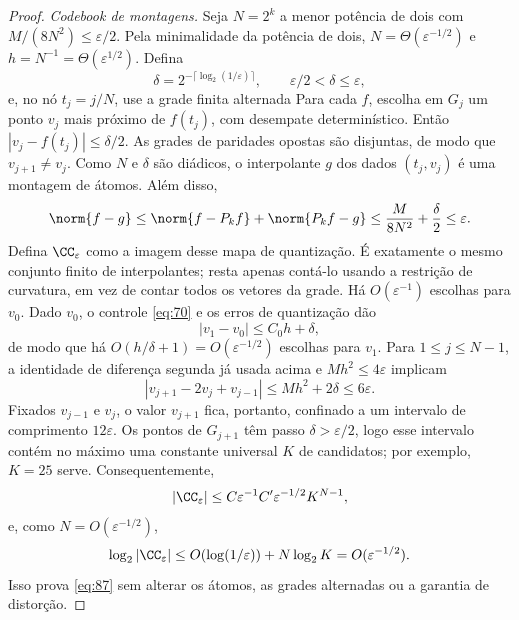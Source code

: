 \begin{proof}
\emph{Codebook de montagens.} Seja $N=2^k$ a menor potência de dois com $M/(8N^2)\le\varepsilon/2$. Pela minimalidade da potência de dois, $N=\Theta(\varepsilon^{-1/2})$ e $h=N^{-1}=\Theta(\varepsilon^{1/2})$. Defina
\[
\delta=2^{-\lceil\log_2(1/\varepsilon)\rceil},\qquad
\varepsilon/2<\delta\le\varepsilon,
\]
e, no nó $t_j=j/N$, use a grade finita alternada
Para cada $f$, escolha em $G_j$ um ponto $v_j$ mais próximo de $f(t_j)$, com desempate determinístico. Então $|v_j-f(t_j)|\le\delta/2$. As grades de paridades opostas são disjuntas, de modo que $v_{j+1}\ne v_j$. Como $N$ e $\delta$ são diádicos, o interpolante $g$ dos dados $(t_j,v_j)$ é uma montagem de átomos. Além disso,
\[
\norm{f-g}\le\norm{f-P_kf}+\norm{P_kf-g}
\le\frac M{8N^2}+\frac\delta2\le\varepsilon.
\]
Defina $\CC_\varepsilon$ como a imagem desse mapa de quantização. É exatamente o mesmo conjunto finito de interpolantes; resta apenas contá-lo usando a restrição de curvatura, em vez de contar todos os vetores da grade. Há $O(\varepsilon^{-1})$ escolhas para $v_0$. Dado $v_0$, o controle \eqref{eq:70} e os erros de quantização dão
\[
|v_1-v_0|\le C_0h+\delta,
\]
de modo que há $O(h/\delta+1)=O(\varepsilon^{-1/2})$ escolhas para $v_1$. Para $1\le j\le N-1$, a identidade de diferença segunda já usada acima e $Mh^2\le4\varepsilon$ implicam
\[
|v_{j+1}-2v_j+v_{j-1}|\le Mh^2+2\delta\le6\varepsilon.
\]
Fixados $v_{j-1}$ e $v_j$, o valor $v_{j+1}$ fica, portanto, confinado a um intervalo de comprimento $12\varepsilon$. Os pontos de $G_{j+1}$ têm passo $\delta>\varepsilon/2$, logo esse intervalo contém no máximo uma constante universal $K$ de candidatos; por exemplo, $K=25$ serve. Consequentemente,
\[
|\CC_\varepsilon|\le C\varepsilon^{-1}C'\varepsilon^{-1/2}K^{N-1},
\]
e, como $N=O(\varepsilon^{-1/2})$,
\[
\log_2|\CC_\varepsilon|\le O(\log(1/\varepsilon))+N\log_2K=O(\varepsilon^{-1/2}).
\]
Isso prova \eqref{eq:87} sem alterar os átomos, as grades alternadas ou a garantia de distorção.
\end{proof}

